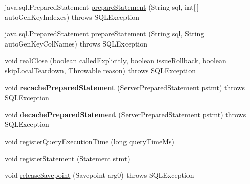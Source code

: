 \begin{DoxyCompactItemize}
\item 
java.\+sql.\+Prepared\+Statement \mbox{\hyperlink{classcom_1_1mysql_1_1jdbc_1_1_connection_impl_a16bfd377059377ad90fe6ea2a3e2edc8}{prepare\+Statement}} (String sql, int\mbox{[}$\,$\mbox{]} auto\+Gen\+Key\+Indexes)  throws S\+Q\+L\+Exception 
\item 
java.\+sql.\+Prepared\+Statement \mbox{\hyperlink{classcom_1_1mysql_1_1jdbc_1_1_connection_impl_a5aeafc10ae08b207b24a7b0e782410e4}{prepare\+Statement}} (String sql, String\mbox{[}$\,$\mbox{]} auto\+Gen\+Key\+Col\+Names)  throws S\+Q\+L\+Exception 
\item 
void \mbox{\hyperlink{classcom_1_1mysql_1_1jdbc_1_1_connection_impl_a644a18de5be3f4793ed1e97834fea266}{real\+Close}} (boolean called\+Explicitly, boolean issue\+Rollback, boolean skip\+Local\+Teardown, Throwable reason)  throws S\+Q\+L\+Exception 
\item 
\mbox{\label{classcom_1_1mysql_1_1jdbc_1_1_connection_impl_a3134a64146e156205dc0db566acb0ce2}} 
void {\bfseries recache\+Prepared\+Statement} (\mbox{\hyperlink{classcom_1_1mysql_1_1jdbc_1_1_server_prepared_statement}{Server\+Prepared\+Statement}} pstmt)  throws S\+Q\+L\+Exception 
\item 
\mbox{\label{classcom_1_1mysql_1_1jdbc_1_1_connection_impl_a7ac725fbbd7785ba5ff88d6309007abf}} 
void {\bfseries decache\+Prepared\+Statement} (\mbox{\hyperlink{classcom_1_1mysql_1_1jdbc_1_1_server_prepared_statement}{Server\+Prepared\+Statement}} pstmt)  throws S\+Q\+L\+Exception 
\item 
void \mbox{\hyperlink{classcom_1_1mysql_1_1jdbc_1_1_connection_impl_afd89826eac9c9203016cb8044b0629d2}{register\+Query\+Execution\+Time}} (long query\+Time\+Ms)
\item 
void \mbox{\hyperlink{classcom_1_1mysql_1_1jdbc_1_1_connection_impl_a54dd983d4854293d33c87b562e220a9c}{register\+Statement}} (\mbox{\hyperlink{interfacecom_1_1mysql_1_1jdbc_1_1_statement}{Statement}} stmt)
\item 
void \mbox{\hyperlink{classcom_1_1mysql_1_1jdbc_1_1_connection_impl_a32810bcdaaa3a3fc32d9c06d29c11a8c}{release\+Savepoint}} (Savepoint arg0)  throws S\+Q\+L\+Exception 
\item 
\mbox{\label{classcom_1_1mysql_1_1jdbc_1_1_connection_impl_a72d133891187bf69da54f37a6d491cda}} 

\end{DoxyCompactItemize}
